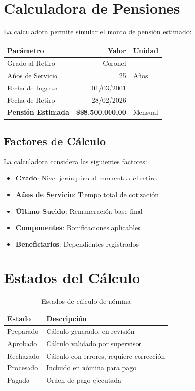 \section{Calculadora de Pensiones}

La calculadora permite simular el monto de pensión estimado:

\begin{tcolorbox}[
    enhanced,
    colback=white,
    colframe=sandraDark,
    width=0.85\textwidth,
    halign=center
]
\begin{tabular}{p{5cm}rp{4cm}}
\toprule
\textbf{Parámetro} & \textbf{Valor} & \textbf{Unidad} \\
\midrule
Grado al Retiro & Coronel & \\
Años de Servicio & 25 & Años \\
Fecha de Ingreso & 01/03/2001 & \\
Fecha de Retiro & 28/02/2026 & \\
\midrule
\textbf{Pensión Estimada} & \textbf{\$\$8.500.000,00} & Mensual \\
\bottomrule
\end{tabular}
\end{tcolorbox}

\subsection*{Factores de Cálculo}

La calculadora considera los siguientes factores:

\begin{itemize}[leftmargin=*]
    \item \textbf{Grado}: Nivel jerárquico al momento del retiro
    \item \textbf{Años de Servicio}: Tiempo total de cotización
    \item \textbf{Último Sueldo}: Remuneración base final
    \item \textbf{Componentes}: Bonificaciones aplicables
    \item \textbf{Beneficiarios}: Dependientes registrados
\end{itemize}

\section{Estados del Cálculo}

\begin{longtable}{p{3cm}p{9cm}}
\toprule
\textbf{Estado} & \textbf{Descripción} \\
\midrule
\endhead
\bottomrule
\caption{Estados de cálculo de nómina}
\label{tab:estados-calculo}
\endlastfoot

Preparado & Cálculo generado, en revisión \\
Aprobado & Cálculo validado por supervisor \\
Rechazado & Cálculo con errores, requiere corrección \\
Procesado & Incluido en nómina para pago \\
Pagado & Orden de pago ejecutada \\
\end{longtable}

